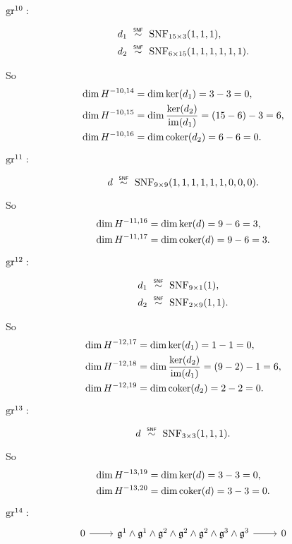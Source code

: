 $\operatorname{gr}^{10}:$

\begin{align*}
  d_{1} &\snfsim \SNF_{15\times3}(1,1,1), \\
  d_{2} &\snfsim \SNF_{6\times15}(1,1,1,1,1,1).
\end{align*}

So
\begin{align*}
  \dim H^{-10,14} &= \dim \operatorname{ker}(d_{1}) = 3-3 = 0, \\
  \dim H^{-10,15} &= \dim \dfrac{\operatorname{ker}(d_{2})}{\operatorname{im}(d_{1})} = (15-6) - 3 = 6, \\
  \dim H^{-10,16} &= \dim \operatorname{coker}(d_{2}) = 6-6 = 0.
\end{align*}

$\operatorname{gr}^{11}:$

\begin{equation*}
  d \snfsim \SNF_{9\times9}(1,1,1,1,1,1,0,0,0).
\end{equation*}

So
\begin{align*}
  \dim H^{-11,16} &= \dim \operatorname{ker}(d) = 9-6 = 3, \\
  \dim H^{-11,17} &= \dim \operatorname{coker}(d) = 9-6 = 3.
\end{align*}

$\operatorname{gr}^{12}:$

\begin{align*}
  d_{1} &\snfsim \SNF_{9\times1}(1), \\
  d_{2} &\snfsim \SNF_{2\times9}(1,1).
\end{align*}

So
\begin{align*}
  \dim H^{-12,17} &= \dim \operatorname{ker}(d_{1}) = 1-1 = 0, \\
  \dim H^{-12,18} &= \dim \dfrac{\operatorname{ker}(d_{2})}{\operatorname{im}(d_{1})} = (9-2) - 1 = 6, \\
  \dim H^{-12,19} &= \dim \operatorname{coker}(d_{2}) = 2-2 = 0.
\end{align*}

$\operatorname{gr}^{13}:$

\begin{equation*}
  d \snfsim \SNF_{3\times3}(1,1,1).
\end{equation*}

So
\begin{align*}
  \dim H^{-13,19} &= \dim \operatorname{ker}(d) = 3-3 = 0, \\
  \dim H^{-13,20} &= \dim \operatorname{coker}(d) = 3-3 = 0.
\end{align*}

$\operatorname{gr}^{14}:$
\[
  \begin{tikzcd}
    0 \ar[r] & \lie{g}^{1} \wedge \lie{g}^{1} \wedge \lie{g}^{2} \wedge \lie{g}^{2} \wedge \lie{g}^{2} \wedge \lie{g}^{3} \wedge \lie{g}^{3}  \ar[r] & 0
  \end{tikzcd}
\]

